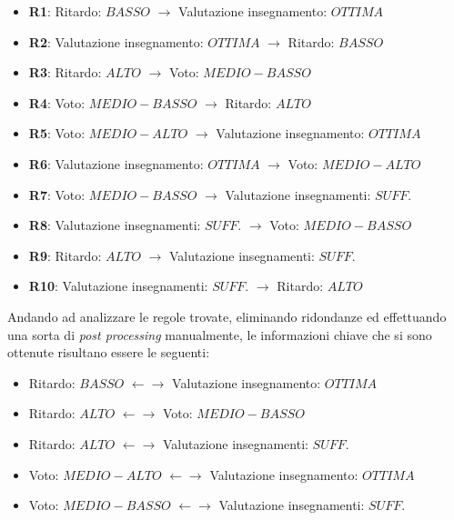            \begin{itemize}
                \item \textbf{R1}: Ritardo: $BASSO$ $\rightarrow$ Valutazione insegnamento: $OTTIMA$
                \item \textbf{R2}: Valutazione insegnamento: $OTTIMA$ $\rightarrow$ Ritardo: $BASSO$
                \item \textbf{R3}: Ritardo: $ALTO$ $\rightarrow$ Voto: $MEDIO-BASSO$
                \item \textbf{R4}: Voto: $MEDIO-BASSO$ $\rightarrow$ Ritardo: $ALTO$
                \item \textbf{R5}: Voto: $MEDIO-ALTO$ $\rightarrow$ Valutazione insegnamento: $OTTIMA$
                \item \textbf{R6}: Valutazione insegnamento: $OTTIMA$ $\rightarrow$ Voto: $MEDIO-ALTO$
                \item \textbf{R7}: Voto: $MEDIO-BASSO$ $\rightarrow$ Valutazione insegnamenti: $SUFF.$
                \item \textbf{R8}: Valutazione insegnamenti: $SUFF.$ $\rightarrow$ Voto: $MEDIO-BASSO$
                \item \textbf{R9}: Ritardo: $ALTO$ $\rightarrow$ Valutazione insegnamenti: $SUFF.$
                \item \textbf{R10}: Valutazione insegnamenti: $SUFF.$ $\rightarrow$ Ritardo: $ALTO$
            \end{itemize}

            Andando ad analizzare le regole trovate, eliminando ridondanze ed effettuando una sorta di \textit{post processing} manualmente, le informazioni chiave che si sono ottenute risultano essere le seguenti:

            \begin{itemize}
                \item Ritardo: $BASSO$ $\leftarrow \rightarrow$ Valutazione insegnamento: $OTTIMA$
                \item Ritardo: $ALTO$ $\leftarrow \rightarrow$ Voto: $MEDIO-BASSO$
                \item Ritardo: $ALTO$ $\leftarrow \rightarrow$ Valutazione insegnamenti: $SUFF.$
                \item Voto: $MEDIO-ALTO$ $\leftarrow \rightarrow$ Valutazione insegnamento: $OTTIMA$
                \item Voto: $MEDIO-BASSO$ $\leftarrow \rightarrow$ Valutazione insegnamenti: $SUFF.$
            \end{itemize}

